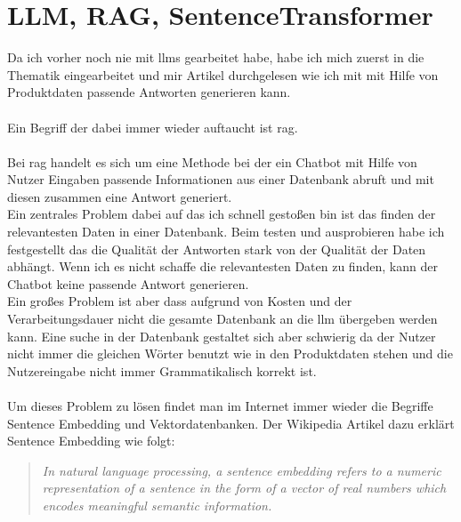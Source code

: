 \section{LLM, RAG, SentenceTransformer}\label{sec:umsetzung_intro}
Da ich vorher noch nie mit \gls{llm}s gearbeitet habe, habe ich mich zuerst in die Thematik eingearbeitet 
und mir Artikel durchgelesen wie ich mit mit Hilfe von Produktdaten passende Antworten generieren kann.\\\\
Ein Begriff der dabei immer wieder auftaucht ist \gls{rag}.\\\\
Bei \gls{rag} handelt es sich um eine Methode bei der ein Chatbot mit Hilfe von Nutzer Eingaben passende 
Informationen aus einer Datenbank abruft und mit diesen zusammen eine Antwort generiert.\\
Ein zentrales Problem dabei auf das ich schnell gestoßen bin ist das finden der relevantesten Daten in einer Datenbank.
Beim testen und ausprobieren habe ich festgestellt das die Qualität der Antworten stark von der Qualität der Daten abhängt.
Wenn ich es nicht schaffe die relevantesten Daten zu finden, kann der Chatbot keine passende Antwort generieren.\\
Ein großes Problem ist aber dass aufgrund von Kosten und der Verarbeitungsdauer nicht die gesamte Datenbank an die \gls{llm} übergeben werden kann.
Eine suche in der Datenbank gestaltet sich aber schwierig da der Nutzer nicht immer die gleichen Wörter benutzt wie in den Produktdaten stehen und
die Nutzereingabe nicht immer Grammatikalisch korrekt ist.\\\\
Um dieses Problem zu lösen findet man im Internet immer wieder die Begriffe Sentence Embedding und Vektordatenbanken.
Der Wikipedia Artikel dazu erklärt Sentence Embedding wie folgt:\\
\cite{wiki:SentEmb}
\begin{quote}
    \textit{In natural language processing, a sentence embedding refers to a numeric representation of a sentence in the form of a vector of real numbers which encodes meaningful semantic information.}
\end{quote}\\

